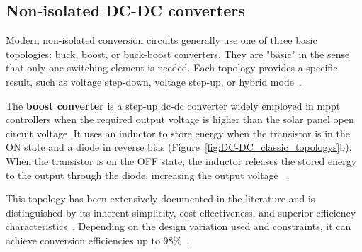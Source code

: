 

    \subsection{Non-isolated DC-DC converters}
        Modern non-isolated conversion circuits generally use one of three basic topologies: buck, boost, or buck-boost converters. They are "basic" in the sense that only one switching element is needed. Each topology provides a specific result, such as voltage step-down, voltage step-up, or hybrid mode~\cite{Comparison_PV_Converter_Technologies_1989}. 

            The \textbf{boost converter} is a step-up \acs{dc}-\acs{dc} converter widely employed in \ac{mppt} controllers when the required output voltage is higher than the solar panel open circuit voltage. 
            It uses an inductor to store energy when the transistor is in the ON state and a diode in reverse bias (Figure~\ref{fig:DC-DC_classic_topologys}b). When the transistor is on the OFF state, the inductor releases the stored energy to the output through the diode, increasing the output voltage ~\cite{Non_Isolated_DC_DC_Converters_MPPT_Controller_2021}.

            This topology has been extensively documented in the literature and is distinguished by its inherent simplicity, cost-effectiveness, and superior efficiency characteristics~\cite{shahira2022_electrical_design_solar_boat}\cite{Look-Up-Table_VS_PeO}\cite{Intelligent_PV_Module_2006}. Depending on the design variation used and constraints, it can achieve conversion efficiencies up to 98\%~\cite{Review_Isolated_Non_isolated_DC_DC_Converter_PV_Application_2018}. 

